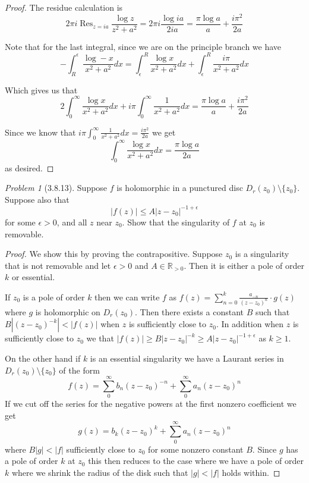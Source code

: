 \documentclass[10pt]{article}
\newcommand{\sk}{\vskip 10mm}
\newcommand{\bb}[1]{\mathbb{#1}}
\DeclareMathOperator{\Res}{Res}
\theoremstyle{remark}
\newtheorem{problem}{Problem}
\theoremstyle{remark}
\begin{document}
\begin{proof}
  The residue calculation is
  \[
    2\pi i\Res_{z=ia}\frac{\log z}{z^2+a^2}= 2\pi i\frac{\log ia}{2ia} = \frac{\pi\log a}{a}+\frac{i\pi^2}{2a}
  \]

  Note that for the last integral, since we are on the principle branch we have
  \[
    -\int_{R}^{\epsilon}\frac{\log -x}{x^2+a^2}dx =\int_\epsilon^R\frac{\log x}{x^2+a^2}dx+\int_\epsilon^R\frac{i\pi}{x^2+a^2}dx
  \]
  
  Which gives us that
  \[
    2\int_0^\infty\frac{\log x}{x^2+a^2}dx+i\pi\int_0^\infty\frac{1}{x^2+a^2}dx = \frac{\pi\log a}{a}+\frac{i\pi^2}{2a}
  \]

  Since we know that $i\pi\int_0^\infty\frac{1}{x^2+a^2}dx = \frac{i\pi^2}{2a}$ we get
  \[
    \int_0^\infty\frac{\log x}{x^2+a^2}dx=\frac{\pi\log a}{2a}
  \]
  as desired.
\end{proof}

\sk

\begin{problem}[3.8.13]
  Suppose $f$ is holomorphic in a punctured disc $D_r(z_0)\setminus\{z_0\}$.
  Suppose also that
  \[
    |f(z)|\leq A|z-z_0|^{-1+\epsilon}
  \]
  for some $\epsilon>0$, and all $z$ near $z_0$. Show that the singularity
  of $f$ at $z_0$ is removable.
\end{problem}

\begin{proof}
  We show this by proving the contrapositive. Suppose $z_0$ is a singularity
  that is not removable and let $\epsilon>0$ and $A\in\bb{R}_{>0}$.
  Then it is either a pole of order $k$ or essential.

  If $z_0$ is a pole of order $k$ then we can write $f$ as
  $f(z)=\sum_{n=0}^k\frac{a_{-n}}{(z-z_0)^{n}}\cdot g(z)$ where $g$ is holomorphic on
  $D_r(z_0)$. Then there exists a constant $B$ such that $B|(z-z_0)^{-k}|<|f(z)|$
  when $z$ is sufficiently close to $z_0$. In addition when $z$ is sufficiently
  close to $z_0$ we that $|f(z)|\geq B|z-z_0|^{-k}\geq A|z-z_0|^{-1+\epsilon}$ as $k\geq 1$.

  On the other hand if $k$ is an essential singularity we have a Laurant
  series in $D_r(z_0)\setminus\{z_0\}$ of the form
  \[
    f(z)=\sum_0^\infty b_n(z-z_0)^{-n} +\sum_0^\infty a_n(z-z_0)^n
  \]
  If we cut off the series for the negative powers at the first nonzero coefficient
  we get
  \[
    g(z)=b_k(z-z_0)^k+\sum_0^\infty a_n(z-z_0)^n
  \]
  where $B|g|<|f|$ sufficiently close to $z_0$ for some nonzero constant $B$. Since
  $g$ has a pole of order $k$ at $z_0$ this then reduces to the case where we have a
  pole of order $k$ where we shrink the radius of the disk such that $|g|<|f|$ holds within.
\end{proof}
\end{document}

